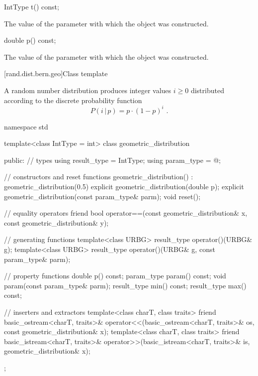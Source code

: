 %
\begin{itemdecl}
IntType t() const;
\end{itemdecl}%
\begin{itemdescr}
\pnum
\returns
The value of the  parameter
 with which the object was constructed.
\end{itemdescr}

%
\begin{itemdecl}
double p() const;
\end{itemdecl}

\begin{itemdescr}
\pnum
\returns
The value of the  parameter
 with which the object was constructed.
\end{itemdescr}


[rand.dist.bern.geo]{Class template }
%

\pnum
A  random number distribution
produces integer values $i \geq 0$
distributed according to
the discrete probability function
\[ P(i\,|\,p) = p \cdot (1-p)^{i} \text{ .} \]

%
%
\begin{codeblock}
namespace std {
  template<class IntType = int>
  class geometric_distribution {
  public:
    // types
    using result_type = IntType;
    using param_type  = @\unspec@;

    // constructors and reset functions
    geometric_distribution() : geometric_distribution(0.5) {}
    explicit geometric_distribution(double p);
    explicit geometric_distribution(const param_type& parm);
    void reset();

    // equality operators
    friend bool operator==(const geometric_distribution& x, const geometric_distribution& y);

    // generating functions
    template<class URBG>
      result_type operator()(URBG& g);
    template<class URBG>
      result_type operator()(URBG& g, const param_type& parm);

    // property functions
    double p() const;
    param_type param() const;
    void param(const param_type& parm);
    result_type min() const;
    result_type max() const;

    // inserters and extractors
    template<class charT, class traits>
      friend basic_ostream<charT, traits>&
        operator<<(basic_ostream<charT, traits>& os, const geometric_distribution& x);
    template<class charT, class traits>
      friend basic_istream<charT, traits>&
        operator>>(basic_istream<charT, traits>& is, geometric_distribution& x);
  };
}
\end{codeblock}


